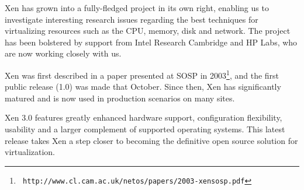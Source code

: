 Xen has grown into a fully-fledged project in its own right, enabling us
to investigate interesting research issues regarding the best techniques
for virtualizing resources such as the CPU, memory, disk and network.
The project has been bolstered by support from Intel Research Cambridge
and HP Labs, who are now working closely with us.

Xen was first described in a paper presented at SOSP in
2003\footnote{\tt
  http://www.cl.cam.ac.uk/netos/papers/2003-xensosp.pdf}, and the first
public release (1.0) was made that October. Since then, Xen has
significantly matured and is now used in production scenarios on many
sites.

Xen 3.0 features greatly enhanced hardware support, configuration
flexibility, usability and a larger complement of supported operating
systems. This latest release takes Xen a step closer to becoming the
definitive open source solution for virtualization.
